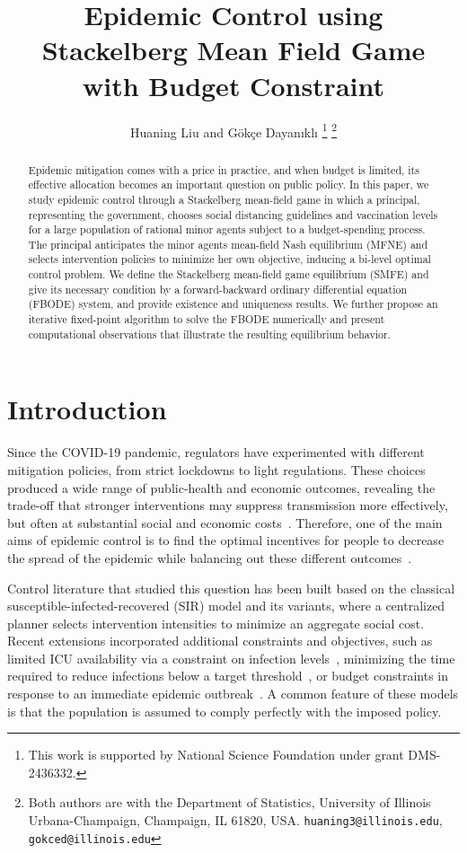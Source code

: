 \documentclass[letterpaper, 10 pt, conference]{ieeeconf}  %
\title{\LARGE \bf
Epidemic Control using Stackelberg Mean Field Game \\ with Budget Constraint
}
\author{Huaning Liu and G\"ok{\c c}e Dayan{\i}kl{\i}
\thanks{This work is supported by National Science Foundation under grant DMS-2436332.}
\thanks{Both authors are with the Department of Statistics,
  University of Illinois Urbana-Champaign, 
  Champaign, IL 61820, USA. {\tt\small huaning3@illinois.edu}, 
        {\tt\small gokced@illinois.edu}}
}
\begin{document}
\maketitle
\thispagestyle{empty}
\pagestyle{empty}


\begin{abstract}
Epidemic mitigation comes with a price in practice, and when budget is limited, its effective allocation becomes an important question on public policy. In this paper, we study epidemic control through a Stackelberg mean-field game in which a principal, representing the government, chooses social distancing guidelines and vaccination levels for a large population of rational minor agents subject to a budget-spending process. The principal anticipates the minor agents mean-field Nash equilibrium (MFNE) and selects intervention policies to minimize her own objective, inducing a bi-level optimal control problem. We define the Stackelberg mean-field game equilibrium (SMFE) and give its necessary condition by a forward-backward ordinary differential equation (FBODE) system, and provide existence and uniqueness results. We further propose an iterative fixed-point algorithm to solve the FBODE numerically and present computational observations that illustrate the resulting equilibrium behavior.
\end{abstract}


\section{Introduction}
Since the COVID-19 pandemic, regulators have experimented with different mitigation policies, from strict lockdowns to light regulations. These choices produced a wide range of public-health and economic outcomes, revealing the trade-off that stronger interventions may suppress transmission more effectively, but often at substantial social and economic costs~\cite{horrible2022}. Therefore, one of the main aims of epidemic control is to find the optimal incentives for people to decrease the spread of the epidemic while balancing out these different outcomes~\cite{elie2020contact,aurell2022optimal}.

Control literature that studied this question has been built based on the classical susceptible-infected-recovered (SIR) model and its variants, where a centralized planner selects intervention intensities to minimize an aggregate social cost. Recent extensions incorporated additional constraints and objectives, such as limited ICU availability via a constraint on infection levels~\cite{Rossa_2024}, minimizing the time required to reduce infections below a target threshold~\cite{Bolzoni_2017}, or budget constraints in response to an immediate epidemic outbreak~\cite{Salcedo2020}. A common feature of these models is that the population is assumed to comply perfectly with the imposed policy.
\end{document}
